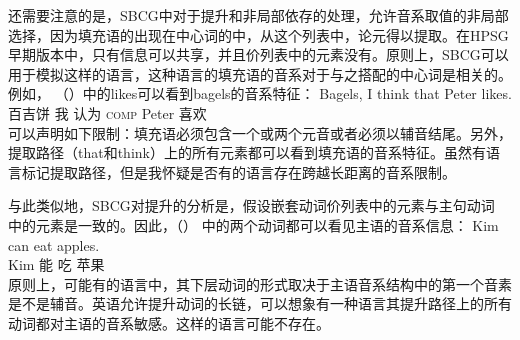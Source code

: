 还需要注意的是，SBCG中对于提升和非局部依存的处理，允许音系取值的非局部选择，因为填充语的\formvc 出现在中心词的\argstlc 中，从这个列表中，论元得以提取。在HPSG早期版本中，只有\localc 信息可以共享，并且价列表中的元素没有\phonfc。原则上，SBCG可以用于模拟这样的语言，这种语言的填充语的音系对于与之搭配的中心词是相关的。例如， （）中的likes可以看到bagels的音系特征：
\ea
\gll Bagels, I think that Peter likes.\\
     百吉饼 我 认为 \textsc{comp} Peter 喜欢\\
\z
可以声明如下限制：填充语必须包含一个或两个元音或者必须以辅音结尾。另外，提取路径（that和think）上的所有元素都可以看到填充语的音系特征。虽然有语言标记提取路径，但是我怀疑是否有的语言存在跨越长距离的音系限制。

与此类似地，SBCG对提升的分析是，假设嵌套动词价列表中的元素与主句动词 \argstlc 中的元素是一致的\citep[]{Sag2012a}。因此，（） 中的两个动词都可以看见主语的音系信息：
\ea
\gll Kim can eat apples.\\
     Kim 能 吃 苹果\\
\z
原则上，可能有的语言中，其下层动词的形式取决于主语音系结构中的第一个音素是不是辅音。英语允许提升动词的长链，可以想象有一种语言其提升路径上的所有动词都对主语的音系敏感。这样的语言可能不存在。

